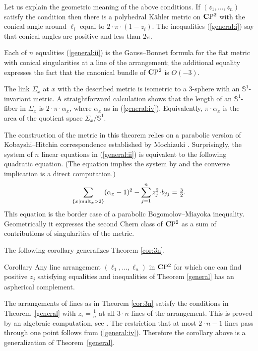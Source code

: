 \documentclass{compositio}
\begin{document}
Let us explain the geometric meaning of the above conditions.
If $(z_1,\dots,z_n)$ satisfy the condition then
there is a polyhedral K\"ahler metric on $\mathbf{C}\mathrm{P}^2$
with the conical angle around $\ell_i$ equal to $2\cdot\pi\cdot(1-z_i)$.
The inequalities (\ref{general:i}) say that conical angles are positive and less than $2\pi$.

Each of $n$ equalities (\ref{general:ii}) 
is the Gauss--Bonnet formula
for the flat metric with conical singularities at a line of the arrangement;
the additional equality expresses the fact that the canonical bundle of
$\mathbf{C}\mathrm{P}^2$ is $O(-3)$.

The link $\Sigma_x$ at $x$ with the described metric
is isometric to a $3$-sphere with an $\mathbb{S}^1$-invariant metric.
A straightforward calculation shows that
the length of an $\mathbb{S}^1$-fiber in $\Sigma_x$ is $2\cdot\pi\cdot\alpha_x$,
where $\alpha_x$ as in (\ref{general:iv}).
Equivalently, $\pi\cdot\alpha_x$ is the area of the quotient space $\Sigma_x/\mathbb{S}^1$.

The construction of the metric in this theorem relies on a parabolic version of Kobayshi--Hitchin correspondence
established by Mochizuki \cite{mochizuki}. 
Surprisingly, the system of $n$ linear equations in
(\ref{general:ii}) is equivalent to the following quadratic equation. 
(The equation 
implies the system by  \cite[Lemma 7.9]{panov} and  the converse implication 
is a direct computation.)
$$\sum_{\{x|\mult_x>2\}}(\alpha_x-1)^2
-
\sum_{j=1}^nz_j^2\cdot b_{jj}
=
\tfrac{3}{2}.$$
This equation is the border case of a parabolic Bogomolov--Miayoka inequality. Geometrically
it expresses the second Chern class of $\mathbf{C}\mathrm{P}^2$ as a sum of contributions of
singularities of the metric.

The following corollary generalizes Theorem \ref{cor:3n}.

\begin{thm}{Corollary}\label{generalarrangement}
Any line arrangement $(\ell_1,\dots,\ell_n)$ in $\mathbf{C}\mathrm{P}^2$
for which one can find positive $z_j$ satisfying equalities and inequalities
of Theorem  \ref{general} has an aspherical complement.
\end{thm}

The arrangements of lines
as in Theorem \ref{cor:3n}
satisfy the conditions in Theorem~\ref{general}
with $z_i =\tfrac1n$
at all $3\cdot n$ lines of the arrangement. 
This is proved by an algebraic computation, see \cite[Corollary 7.8]{panov}.
The restriction that at most $2\cdot n-1$ lines pass through one point
follows from (\ref{general:iv}).
Therefore the corollary above is a generalization of  Theorem~\ref{general}.
\end{document}
